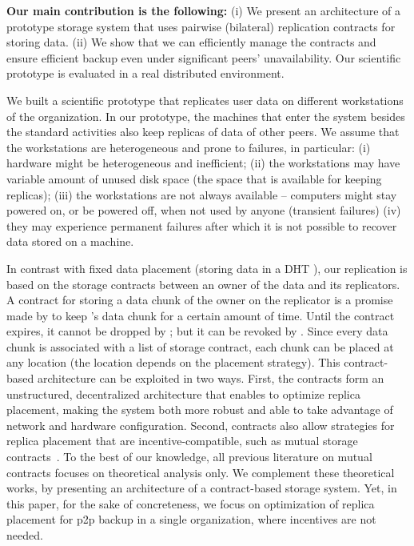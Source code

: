\documentclass[10pt, final, conference, letterpaper]{IEEEtran}
\begin{document}
\textbf{Our main contribution is the following:} (i) We present an architecture of a prototype storage system that uses pairwise (bilateral) replication contracts for storing data. (ii) We show that we can efficiently manage the contracts and ensure efficient backup
even under significant peers' unavailability. Our scientific prototype is evaluated in a real distributed environment.

We built a scientific prototype that replicates user data on different workstations of the organization. In our prototype, the machines that enter the system besides the standard activities also keep replicas of data of other peers. We assume that the workstations are heterogeneous and prone to failures, in particular: (i) hardware might be heterogeneous and inefficient; (ii) the workstations may have variable amount of unused disk space (the space that is available for keeping replicas); (iii) the workstations are not always available -- computers might stay powered on, or be powered off, when not used by anyone (transient failures) (iv) they may experience permanent failures after which it is not possible to recover data stored on a machine.

In contrast with fixed data placement (storing data in a DHT \cite{ivyP2PFileSystem, pastisP2PFileSystem, igorFs, bitVault, bigTable}), our replication is based on the storage contracts between an owner of the data and its replicators. A contract for storing a data chunk of the owner  on the replicator  is a promise made by  to keep 's data chunk for a certain amount of time. Until the contract expires, it cannot be dropped by ; but it can be revoked by . Since every data chunk is associated with a list of storage contract, each chunk can be placed at any location (the location depends on the placement strategy). This contract-based architecture can be exploited in two ways. First, the contracts form an unstructured, decentralized architecture that enables to optimize replica placement, making the system both more robust and able to take advantage of network and hardware configuration.
Second, contracts also allow strategies for replica placement that are incentive-compatible, such as mutual storage contracts~\cite{Rzadca2010ReplicaPlacementin, cox2003samsara}. To the best of our knowledge, all previous literature on mutual contracts focuses on theoretical analysis only. We complement these theoretical works, by presenting an architecture of a contract-based storage system. Yet, in this paper, for the sake of concreteness, we focus on optimization of replica placement for p2p backup in a single organization, where incentives are not needed.
\end{document}
